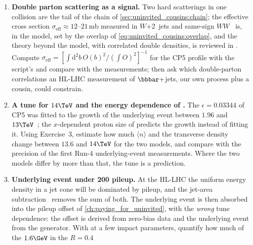 \begin{enumerate}
    interactions between overlapping strings and reproduce part of both.
    Our event has $33$ strings in a transverse area of a few fm$^2$. Using
    the strings the script prints, estimate how many overlap in the
    transverse plane at the $b$ quark's position; the question is whether
    a $b$ jet in a central collision hadronises in the same vacuum as one
    in a peripheral collision, and HL-LHC $b$-jet samples will be large
    enough to split by underlying-event activity.
  \item \textbf{Double parton scattering as a signal.} Two hard
    scatterings in one collision are the tail of the chain of
    \cref{sec:uninvited_cousins:chain}; the effective cross section
    $\sigma_{\mathrm{eff}}\approx12$--$21\,\mathrm{mb}$ measured in $W$+2~jets
    \cite{CMS:2013huw} and same-sign $WW$~\cite{CMS:2022pio} is, in the
    model, set by the overlap of \cref{eq:uninvited_cousins:overlap}, and
    the theory beyond the model, with correlated double densities, is
    reviewed in \cite{Diehl:2017wew,Bansal:2014paa}. Compute
    $\sigma_{\mathrm{eff}}=\left[\int\mathrm{d}^2b\,O(b)^2/(\int O)^2\right]^{-1}$
    for the CP5 profile with the script's  and compare with
    the measurements; then ask which double-parton correlations an HL-LHC
    measurement of $\bbbar+$jets, our own process plus a cousin, could
    constrain.
  \item \textbf{A tune for $14\TeV$ and the energy dependence of
    \ptzero.} The $\epsilon=0.03344$ of CP5 was fitted to the growth of the
    underlying event between $1.96$ and $13\TeV$~\cite{CMS:2019csb}; the
    $x$-dependent proton size of \cite{Corke:2011yy} predicts the growth
    instead of fitting it. Using Exercise~3, estimate how much
    $\langle n\rangle$ and the transverse density change between $13.6$ and
    $14\TeV$ for the two models, and compare with the precision of the
    first Run-4 underlying-event measurements. Where the two models differ
    by more than that, the tune is a prediction.
  \item \textbf{Underlying event under 200 pileup.} At the HL-LHC the
    uniform energy density in a jet cone will be dominated by pileup, and
    the jet-area subtraction~\cite{Cacciari:2008gn} removes the sum of
    both. The underlying event is then absorbed into the pileup offset of
    \cref{ch:paying_for_uninvited}, with the \emph{wrong} tune
    dependence: the offset is derived from zero-bias data and the
    underlying event from the generator. With  at a few
    impact parameters, quantify how much of the $1.6\GeV$ in the $R=0.4$

\end{enumerate}
